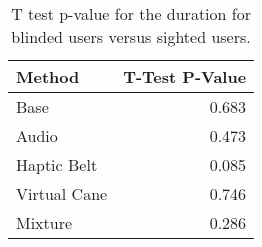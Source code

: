 
\begin{table}[!htb]
\centering
\caption{T test p-value for the duration for blinded users versus sighted users.}
\label{tab:ttest_duration}
\begin{tabular}{lr}
\toprule
      Method &  T-Test P-Value \\
\midrule
        Base &           0.683 \\
       Audio &           0.473 \\
 Haptic Belt &           0.085 \\
Virtual Cane &           0.746 \\
     Mixture &           0.286 \\
\bottomrule
\end{tabular}
\end{table}

